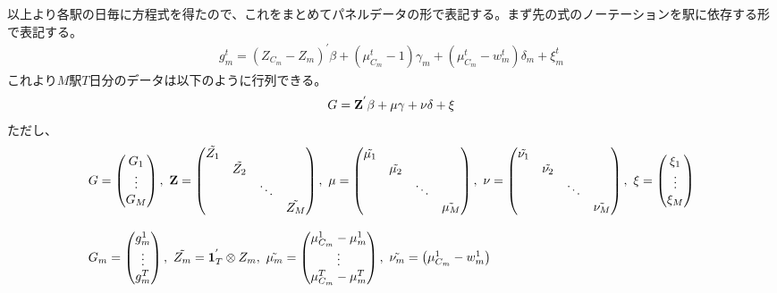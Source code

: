 \documentclass{jsarticle}
\begin{document}
以上より各駅の日毎に方程式を得たので、これをまとめてパネルデータの形で表記する。まず先の式のノーテーションを駅に依存する形で表記する。
\begin{align*}
	g_m^t = (Z_{C_m} - Z_m)^{'} \beta + \left(\mu_{C_m}^t-1\right)\gamma_m + (\mu_{C_m}^t - w_m^t)\delta_m + \xi_m^t
\end{align*}
これより$M$駅$T$日分のデータは以下のように行列できる。
\begin{align*}
	G = {\bf Z}^{'}\beta + {\bf \mu} \gamma + {\bf \nu} \delta + \xi
\end{align*}
ただし、
\begin{align*}
	&G = \begin{pmatrix} G_1\\
	\vdots\\
	G_M\end{pmatrix},\ {\bf Z} = \begin{pmatrix} \tilde{Z_1}&&&\\
	&\tilde{Z_2}&&\\
	&&\ddots&\\
	&&&\tilde{Z_M}
	\end{pmatrix},\ {\bf \mu} =  \begin{pmatrix} \tilde{\mu_1}&&&\\
	&\tilde{\mu_2}&&\\
	&&\ddots&\\
	&&&\tilde{\mu_M}
	\end{pmatrix},\ {\bf \nu} =  \begin{pmatrix} \tilde{\nu_1}&&&\\
	&\tilde{\nu_2}&&\\
	&&\ddots&\\
	&&&\tilde{\nu_M}
	\end{pmatrix},\ \xi = \begin{pmatrix} \xi_1\\
	\vdots\\
	\xi_M \end{pmatrix}\\[8pt]
	&G_m = \begin{pmatrix} g_m^1\\
	\vdots\\
	g_m^T\end{pmatrix},\ \tilde{Z_m} = {\bf 1}_{T}^{'}\otimes Z_m,\ \tilde{\mu_m} = \begin{pmatrix} \mu_{C_m}^1 - \mu_m^1\\
	\vdots\\
	\mu_{C_m}^T - \mu_m^T\end{pmatrix},\ \tilde{\nu_m} = \begin{pmatrix} \mu_{C_m}^1 - w_m^1\\

\end{pmatrix}
\end{align*}
\end{document}
